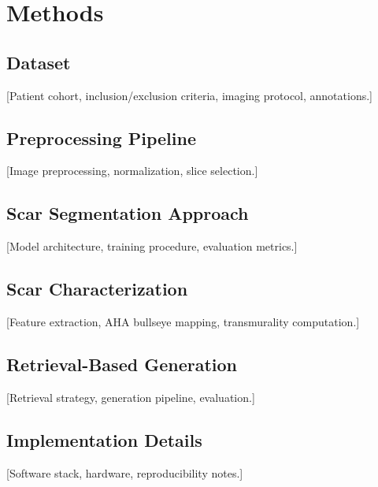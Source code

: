\chapter{Methods}

\section{Dataset}
[Patient cohort, inclusion/exclusion criteria, imaging protocol, annotations.]

\section{Preprocessing Pipeline}
[Image preprocessing, normalization, slice selection.]

\section{Scar Segmentation Approach}
[Model architecture, training procedure, evaluation metrics.]

\section{Scar Characterization}
[Feature extraction, AHA bullseye mapping, transmurality computation.]

\section{Retrieval-Based Generation}
[Retrieval strategy, generation pipeline, evaluation.]

\section{Implementation Details}
[Software stack, hardware, reproducibility notes.]
